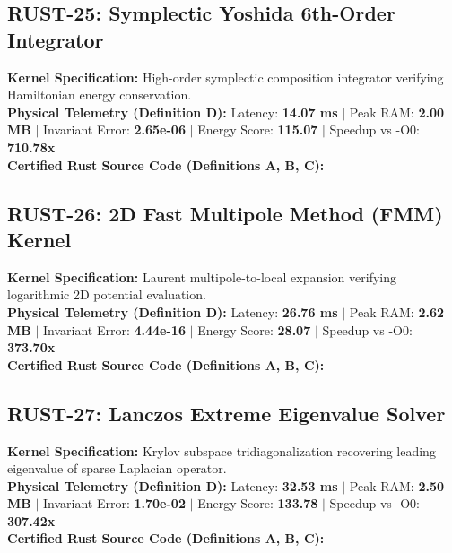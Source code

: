 \vspace{1em}
\subsection{RUST-25: Symplectic Yoshida 6th-Order Integrator}
\textbf{Kernel Specification:} High-order symplectic composition integrator verifying Hamiltonian energy conservation.\\
\textbf{Physical Telemetry (Definition D):} Latency: \textbf{14.07 ms} $|$ Peak RAM: \textbf{2.00 MB} $|$ Invariant Error: \textbf{2.65e-06} $|$ Energy Score: \textbf{115.07} $|$ Speedup vs -O0: \textbf{710.78x}\\

\textbf{Certified Rust Source Code (Definitions A, B, C):}


\vspace{1em}
\subsection{RUST-26: 2D Fast Multipole Method (FMM) Kernel}
\textbf{Kernel Specification:} Laurent multipole-to-local expansion verifying logarithmic 2D potential evaluation.\\
\textbf{Physical Telemetry (Definition D):} Latency: \textbf{26.76 ms} $|$ Peak RAM: \textbf{2.62 MB} $|$ Invariant Error: \textbf{4.44e-16} $|$ Energy Score: \textbf{28.07} $|$ Speedup vs -O0: \textbf{373.70x}\\

\textbf{Certified Rust Source Code (Definitions A, B, C):}


\vspace{1em}
\subsection{RUST-27: Lanczos Extreme Eigenvalue Solver}
\textbf{Kernel Specification:} Krylov subspace tridiagonalization recovering leading eigenvalue of sparse Laplacian operator.\\
\textbf{Physical Telemetry (Definition D):} Latency: \textbf{32.53 ms} $|$ Peak RAM: \textbf{2.50 MB} $|$ Invariant Error: \textbf{1.70e-02} $|$ Energy Score: \textbf{133.78} $|$ Speedup vs -O0: \textbf{307.42x}\\

\textbf{Certified Rust Source Code (Definitions A, B, C):}


